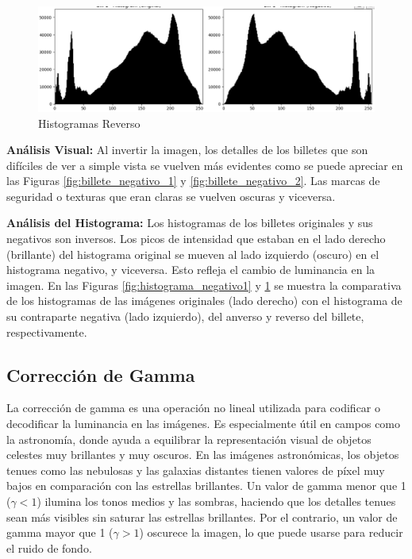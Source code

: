 \documentclass[12pt,letterpaper]{article}
\begin{document}
\begin{figure}[H]
  \centering
  \includegraphics[width=0.5\linewidth]{figuras/histograma_negativo2.png}
  \caption{Histogramas Reverso}
  \label{fig:histograma_negativo2}
\end{figure}

\textbf{Análisis Visual:} Al invertir la imagen, los detalles de los billetes que son difíciles de ver a simple vista se vuelven más evidentes como se puede apreciar en las Figuras \ref{fig:billete_negativo_1} y \ref{fig:billete_negativo_2}. Las marcas de seguridad o texturas que eran claras se vuelven oscuras y viceversa.

\textbf{Análisis del Histograma:} Los histogramas de los billetes originales y sus negativos son inversos. Los picos de intensidad que estaban en el lado derecho (brillante) del histograma original se mueven al lado izquierdo (oscuro) en el histograma negativo, y viceversa. Esto refleja el cambio de luminancia en la imagen. En las Figuras \ref{fig:histograma_negativo1} y \ref{fig:histograma_negativo2} se muestra la comparativa de los histogramas de las imágenes originales (lado derecho) con el histograma de su contraparte negativa (lado izquierdo), del anverso y reverso del billete, respectivamente.

\subsection{Corrección de Gamma}

La corrección de gamma es una operación no lineal utilizada para codificar o decodificar la luminancia en las imágenes. Es especialmente útil en campos como la astronomía, donde ayuda a equilibrar la representación visual de objetos celestes muy brillantes y muy oscuros.
En las imágenes astronómicas, los objetos tenues como las nebulosas y las galaxias distantes tienen valores de píxel muy bajos en comparación con las estrellas brillantes. Un valor de gamma menor que 1 ($\gamma < 1$) ilumina los tonos medios y las sombras, haciendo que los detalles tenues sean más visibles sin saturar las estrellas brillantes. Por el contrario, un valor de gamma mayor que 1 ($\gamma > 1$) oscurece la imagen, lo que puede usarse para reducir el ruido de fondo.
\end{document}
